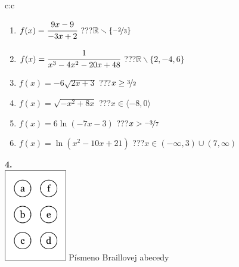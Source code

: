 \documentclass[10pt]{report}
\begin{document}
\begin{tabular}{c:c}
\begin{minipage}[c][104.5mm][t]{0.5\linewidth}
\begin{center}
\begin{minipage}{0.79\linewidth}
\begin{center}
\begin{varwidth}{\linewidth}
\begin{enumerate}
\item $f(x)=\cfrac{9x-9}{-3x+2}$\quad \dotfill\; ???\;\dotfill \quad $\mathbb{R}\smallsetminus\{\nicefrac{-2}{3}\}$
\item $f(x)=\cfrac{1}{x^3-4x^2-20x+48}$\quad \dotfill\; ???\;\dotfill \quad $\mathbb{R}\smallsetminus\{2,-4,6\}$
\item $f(x)=-6\sqrt{2x+3}$\quad \dotfill\; ???\;\dotfill \quad $x\geq\nicefrac{3}{2}$
\item $f(x)=\sqrt{-x^2+8x}$\quad \dotfill\; ???\;\dotfill \quad $x\in\langle-8 , 0\rangle$
\item $f(x)=6\ln{(-7x-3)}$\quad \dotfill\; ???\;\dotfill \quad $x>\nicefrac{-3}{7}$
\item $f(x)=\ln{(x^2-10x+21)}$\quad \dotfill\; ???\;\dotfill \quad $x\in(-\infty , 3)\cup(7 , \infty)$
\end{enumerate}
\end{varwidth}
\end{center}
\end{minipage}
\begin{minipage}{0.20\linewidth}
\begin{center}
{\Huge\bfseries 4.} \\[2mm]
\includegraphics[height=40mm]{../images/braille.png}
{\small Písmeno Braillovej abecedy}
\end{center}
\end{minipage}
\end{center}
\end{minipage}
%
\end{tabular}
\newpage
\thispagestyle{empty}
\end{document}
